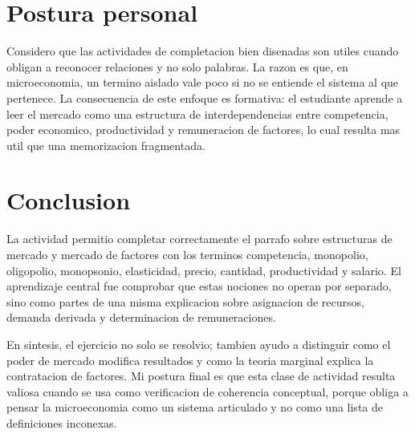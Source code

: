 \documentclass[
	spanish,
	letterpaper, oneside
]{article}
\begin{document}
\section{Postura personal}

Considero que las actividades de completacion bien disenadas son utiles cuando obligan a reconocer relaciones y no solo palabras. La razon es que, en microeconomia, un termino aislado vale poco si no se entiende el sistema al que pertenece. La consecuencia de este enfoque es formativa: el estudiante aprende a leer el mercado como una estructura de interdependencias entre competencia, poder economico, productividad y remuneracion de factores, lo cual resulta mas util que una memorizacion fragmentada.

\section{Conclusion}

La actividad permitio completar correctamente el parrafo sobre estructuras de mercado y mercado de factores con los terminos competencia, monopolio, oligopolio, monopsonio, elasticidad, precio, cantidad, productividad y salario. El aprendizaje central fue comprobar que estas nociones no operan por separado, sino como partes de una misma explicacion sobre asignacion de recursos, demanda derivada y determinacion de remuneraciones.

En sintesis, el ejercicio no solo se resolvio; tambien ayudo a distinguir como el poder de mercado modifica resultados y como la teoria marginal explica la contratacion de factores. Mi postura final es que esta clase de actividad resulta valiosa cuando se usa como verificacion de coherencia conceptual, porque obliga a pensar la microeconomia como un sistema articulado y no como una lista de definiciones inconexas.




\end{document}
